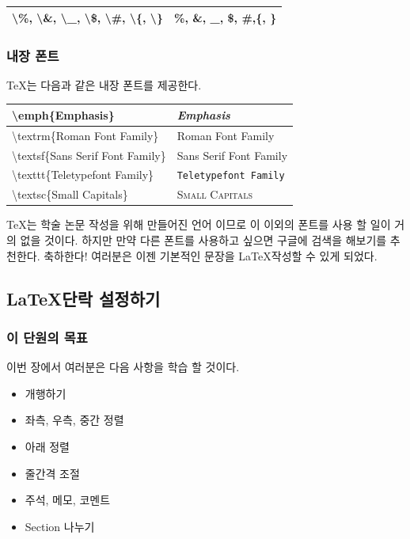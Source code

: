 \documentclass[12pt]{article}
\begin{document}
	\begin{tabularx}{\textwidth \onehalfspacing}{|X|X|}
		\hline
		\textbackslash \%, \textbackslash \&, \textbackslash \_, \textbackslash \$, \textbackslash \#, \textbackslash \{, \textbackslash\} & \%, \&, \_, \$, \#,\{, \}\\
		\hline
	\end{tabularx}
	\clearpage
	\subsubsection{내장 폰트}
	\TeX 는 다음과 같은 내장 폰트를 제공한다.\newline
	
	\begin{tabularx}{\textwidth\onehalfspacing}{|X|X|}
		\hline
		\textbackslash emph\{Emphasis\}&\emph{Emphasis}\\
		\hline
		\textbackslash textrm\{Roman Font Family\}&\textrm{Roman Font Family}\\
		\hline
		\textbackslash textsf\{Sans Serif Font Family\}&\textsf{Sans Serif Font Family}\\
		\hline
		\textbackslash texttt\{Teletypefont Family\}&\texttt{Teletypefont Family}\\
		\hline
		\textbackslash textsc\{Small Capitals\}& \textsc{Small Capitals}\\
		\hline
	\end{tabularx}\newline\newline
	\TeX 는 학술 논문 작성을 위해 만들어진 언어 이므로 이 이외의 폰트를 사용 할 일이 거의 없을 것이다. 하지만 만약 다른 폰트를 사용하고 싶으면 구글에 검색을 해보기를 추천한다.
	\vfill 축하한다! 여러분은 이젠 기본적인 문장을 \LaTeX \로 작성할 수 있게 되었다.
	\clearpage
	
	\subsection{\LaTeX 단락 설정하기}
	\subsubsection{이 단원의 목표}
	이번 장에서 여러분은 다음 사항을 학습 할 것이다.
	\begin{itemize}
		\item 개행하기
		\item 좌측, 우측, 중간 정렬
		\item 아래 정렬
		\item 줄간격 조절
		\item 주석, 메모, 코멘트
		\item Section 나누기
	\end{itemize} 
\end{document}
